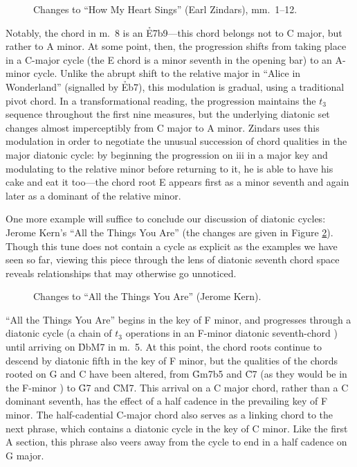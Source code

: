 \begin{figure}[htbp]
  \caption{Changes to “How My Heart Sings” (Earl Zindars), mm.~1--12.}
  \label{ds:heart-sings-changes}
\end{figure}

Notably, the chord in m.~8 is an \h{E7b9}---this chord belongs not to C major,
but rather to A minor. At some point, then, the progression shifts from taking
place in a C-major cycle (the E chord is a minor seventh in the opening bar)
to an A-minor cycle. Unlike the abrupt shift to the relative major in “Alice
in Wonderland” (signalled by \h{Eb7}), this modulation is gradual, using a
traditional pivot chord. In a transformational reading, the
progression maintains the $t_3$ sequence throughout the first nine measures,
but the underlying diatonic set changes almost imperceptibly from C major to A
minor. Zindars uses this modulation in order to negotiate the unusual
succession of chord qualities in the major diatonic cycle: by beginning the
progression on iii in a major key and modulating to the relative minor before
returning to it, he is able to have his cake and eat it too---the chord root E
appears first as a minor seventh and again later as a dominant of the relative
minor.

One more example will suffice to conclude our discussion of diatonic cycles:
Jerome Kern’s “All the Things You Are” (the changes are given in Figure
\ref{ds:all-things-changes}). Though this tune does not contain a
cycle as explicit as the examples we have seen so far, viewing this piece
through the lens of diatonic seventh chord space reveals relationships that may
otherwise go unnoticed.

\begin{figure}[htbp]
  \caption{Changes to “All the Things You Are” (Jerome Kern).}
  \label{ds:all-things-changes}
\end{figure}

“All the Things You Are” begins in the key of F minor, and progresses through
a diatonic cycle (a chain of $t_3$ operations in an F-minor diatonic
seventh-chord \gis{}) until arriving on \h{DbM7} in m.~5. At this point, the
chord roots continue to descend by diatonic fifth in the key of F minor, but
the qualities of the chords rooted on G and C have been altered, from
\h{Gm7b5} and \h{C7} (as they would be in the F-minor \gis{}) to \h{G7} and
\h{CM7}. This arrival on a C major chord, rather than a C dominant seventh,
has the effect of a half cadence in the prevailing key of F minor. The
half-cadential C-major chord also serves as a linking chord to the next
phrase, which contains a diatonic cycle in the key of C minor. Like the first
A section, this phrase also veers away from the cycle to end in a half cadence
on G major.

